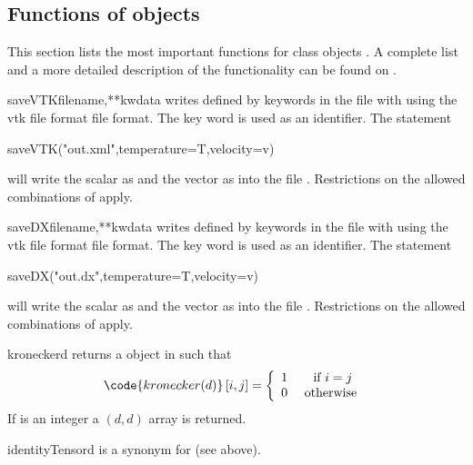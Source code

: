 \subsection{Functions of \Data objects}
This section lists the most important functions for \Data class objects .
A complete list and a more detailed description of the functionality can be found on \ReferenceGuide.
\begin{funcdesc}{saveVTK}{filename,**kwdata}
writes \Data defined by keywords in the file with  using the 
vtk file format \VTK file format. The key word is used as an identifier. The statement
\begin{python}
  saveVTK("out.xml",temperature=T,velocity=v)
\end{python} 
will write the scalar  as  and the vector  as   into the 
file . Restrictions on the allowed combinations of \FunctionSpace apply.
\end{funcdesc}
\begin{funcdesc}{saveDX}{filename,**kwdata}
writes \Data defined by keywords in the file with  using the 
vtk file format \OpenDX file format. The key word is used as an identifier. The statement
\begin{python}
  saveDX("out.dx",temperature=T,velocity=v)
\end{python} 
will write the scalar  as  and the vector  as   into the 
file . Restrictions on the allowed combinations of \FunctionSpace apply.
\end{funcdesc}
\begin{funcdesc}{kronecker}{d}
returns a \RankTwo \Data object in \FunctionSpace {} such that
\begin{equation}
\code{kronecker(d)}\left[ i,j\right] = \left\{ 
\begin{array}{cc}
1 & \mbox{ if } i=j \\
0 & \mbox{ otherwise }
\end{array}
\right.
\end{equation}
If  is an integer a $(d,d)$ \numarray array is returned.
\end{funcdesc}
\begin{funcdesc}{identityTensor}{d}
is a synonym for  (see above).
\end{funcdesc}

